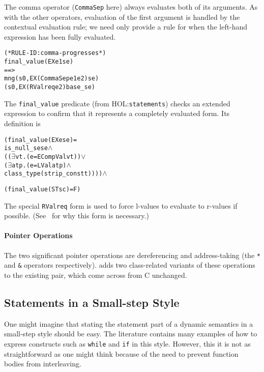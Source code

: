 \documentclass[11pt]{article}
\newcommand{\HOLfile}[1]{HOL:\texttt{#1}}
\begin{document}
\medskip
\noindent 
{} The comma operator
(\texttt{CommaSep} here) always evaluates both of its arguments.  As
with the other operators, evaluation of the first argument is handled
by the contextual evaluation rule; we need only provide a rule for
when the left-hand expression has been fully evaluated.
\begin{alltt}
(* RULE-ID: comma-progresses *)
     final_value (EX e1 se)
   ==>
     mng (s0, EX (CommaSep e1 e2) se) 
         (s0, EX (RValreq e2) base_se)
\end{alltt}
The \texttt{final_value} predicate (from \HOLfile{statements}) checks
an extended expression to confirm that it represents a completely
evaluated form.  Its definition is

\begin{minipage}{\textwidth}
\begin{alltt}
   (final_value (EX e se) =
      is_null_se se \(\land\)
      ((\(\exists\)v t. (e = ECompVal v t)) \(\lor\)
       (\(\exists\)a t p. (e = LVal a t p) \(\land\) 
                class_type (strip_const t)))) \(\land\)

   (final_value (ST s c) = F)
\end{alltt}
\end{minipage}

\bigskip
{}
\noindent The special \texttt{RValreq} form is used to force l-values to
evaluate to r-values if possible.  (See~\cite[\S3.3.3]{Norrish98} for
why this form is necessary.)

\paragraph{Pointer Operations}
The two significant pointer operations are dereferencing and
address-taking (the \texttt{*} and \texttt{\&} operators
respectively).  \cpp{} adds two class-related variants of these
operations to the existing pair, which come across from C unchanged. 


\subsection{Statements in a Small-step Style}
\label{sec:small-step-stmts}

One might imagine that stating the statement part of a dynamic
semantics in a small-step style should be easy.  The literature
contains many examples of how to express constructs such as
\texttt{while} and \texttt{if} in this style.  However, this it is not
as straightforward as one might think because of the need to prevent
function bodies from interleaving.
\end{document}
